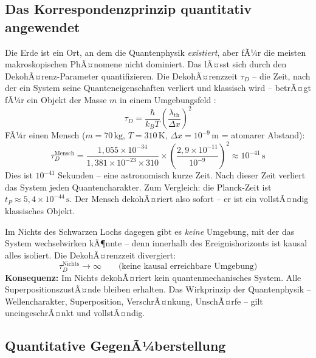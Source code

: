 ﻿\documentclass[12pt,a4paper]{report}
\begin{document}
\subsection{Das Korrespondenzprinzip quantitativ angewendet}

Die Erde ist ein Ort, an dem die Quantenphysik \emph{existiert}, aber fÃ¼r die meisten makroskopischen PhÃ¤nomene nicht dominiert. Das lÃ¤sst sich durch den DekohÃ¤renz-Parameter quantifizieren. Die DekohÃ¤renzzeit $\tau_D$ -- die Zeit, nach der ein System seine Quanteneigenschaften verliert und klassisch wird -- betrÃ¤gt fÃ¼r ein Objekt der Masse $m$ in einem Umgebungsfeld \cite{zurek2003}:
\begin{equation}
    \tau_D = \frac{\hbar}{k_B T} \left(\frac{\lambda_{\text{th}}}{\Delta x}\right)^2
    \label{eq:dekohaerenz}
\end{equation}
FÃ¼r einen Mensch ($m = 70\,\text{kg}$, $T = 310\,\text{K}$, $\Delta x = 10^{-9}\,\text{m}$ = atomarer Abstand):
\begin{equation}
    \tau_D^{\text{Mensch}} = \frac{1{,}055 \times 10^{-34}}{1{,}381 \times 10^{-23} \times 310} \times \left(\frac{2{,}9 \times 10^{-11}}{10^{-9}}\right)^2 \approx 10^{-41}\,\text{s}
\end{equation}
Dies ist $10^{-41}$ Sekunden -- eine astronomisch kurze Zeit. Nach dieser Zeit verliert das System jeden Quantencharakter. Zum Vergleich: die Planck-Zeit ist $t_P \approx 5{,}4 \times 10^{-44}\,\text{s}$. Der Mensch dekohÃ¤riert also sofort -- er ist ein vollstÃ¤ndig klassisches Objekt.

Im Nichts des Schwarzen Lochs dagegen gibt es \emph{keine} Umgebung, mit der das System wechselwirken kÃ¶nnte -- denn innerhalb des Ereignishorizonts ist kausal alles isoliert. Die DekohÃ¤renzzeit divergiert:
\begin{equation}
    \tau_D^{\text{Nichts}} \to \infty \qquad \text{(keine kausal erreichbare Umgebung)}
    \label{eq:dekohaerenz_nichts}
\end{equation}
\textbf{Konsequenz:} Im Nichts dekohÃ¤riert kein quantenmechanisches System. Alle SuperpositionszustÃ¤nde bleiben erhalten. Das Wirkprinzip der Quantenphysik -- Wellencharakter, Superposition, VerschrÃ¤nkung, UnschÃ¤rfe -- gilt uneingeschrÃ¤nkt und vollstÃ¤ndig.

\subsection{Quantitative GegenÃ¼berstellung}
\end{document}
